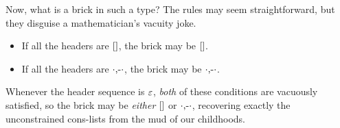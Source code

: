 \documentclass{article}
\begin{document}
Now, what is a brick in such a type? The rules may seem straightforward, but they disguise a mathematician's vacuity joke.
\begin{itemize}
\item If all the headers are $[]$, the brick may be $[]$.
\item If all the headers are $\cdot\mbox{$,\!\textrm{-}$}\cdot$, the brick may be $\cdot\mbox{$,\!\textrm{-}$}\cdot$.
\end{itemize}
Whenever the header sequence is $\varepsilon$, \emph{both} of these conditions are vacuously satisfied, so the brick may be \emph{either} $[]$ or $\cdot\mbox{$,\!\textrm{-}$}\cdot$, recovering exactly the unconstrained cons-lists from the mud of our childhoods.
\end{document}

